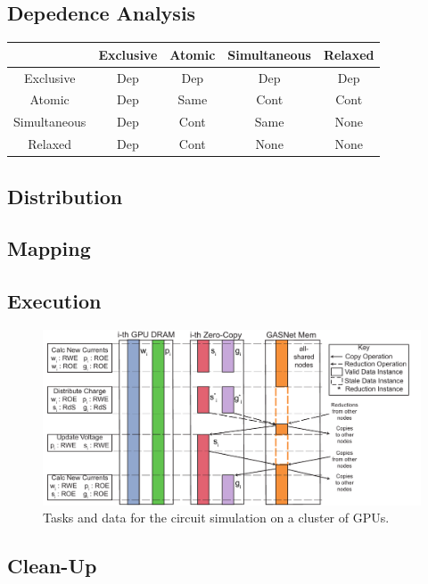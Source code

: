 

\subsection{Depedence Analysis}
\label{sec:dep}
{\small
\begin{tabular}{c|cccc}
             & Exclusive & Atomic   & Simultaneous & Relaxed \\
\midrule
Exclusive    & Dep & Dep & Dep & Dep \\ 
Atomic       & Dep & Same & Cont & Cont \\
Simultaneous & Dep & Cont & Same & None \\
Relaxed      & Dep & Cont & None & None \\
\end{tabular}
}

\subsection{Distribution}
\label{sec:dist}

\subsection{Mapping}
\label{sec:map}

\subsection{Execution}
\label{sec:exec}

\begin{figure}
\includegraphics[scale=0.48]{figs/CircuitMem.pdf}
\caption{Tasks and data for the circuit simulation on a cluster of GPUs.}
\end{figure}

\subsection{Clean-Up}
\label{sec:clean}

